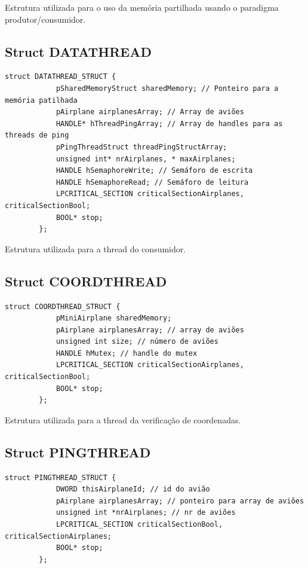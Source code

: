 \documentclass[11pt]{article}
\begin{document}
	Estrutura utilizada para o uso da memória partilhada usando o paradigma produtor/consumidor.
	
	
	\large
	\subsection{Struct DATATHREAD}
	\normalsize
	
	\begin{lstlisting}[caption=Struct DATATHREAD\_STRUCT]
        struct DATATHREAD_STRUCT {
        	pSharedMemoryStruct sharedMemory; // Ponteiro para a memória patilhada
        	pAirplane airplanesArray; // Array de aviões
        	HANDLE* hThreadPingArray; // Array de handles para as threads de ping
        	pPingThreadStruct threadPingStructArray;
        	unsigned int* nrAirplanes, * maxAirplanes;
        	HANDLE hSemaphoreWrite; // Semáforo de escrita
        	HANDLE hSemaphoreRead; // Semáforo de leitura
        	LPCRITICAL_SECTION criticalSectionAirplanes, criticalSectionBool;
        	BOOL* stop;
        };
	\end{lstlisting}
	
	Estrutura utilizada para a thread do consumidor.


	\large
	\subsection{Struct COORDTHREAD}
	\normalsize
	
	\begin{lstlisting}[caption=Struct COORDTHREAD\_STRUCT]
        struct COORDTHREAD_STRUCT {
        	pMiniAirplane sharedMemory;
        	pAirplane airplanesArray; // array de aviões
        	unsigned int size; // número de aviões
        	HANDLE hMutex; // handle do mutex
        	LPCRITICAL_SECTION criticalSectionAirplanes, criticalSectionBool;
        	BOOL* stop;
        };
	\end{lstlisting}
	
	Estrutura utilizada para a thread da verificação de coordenadas.


	\large
	\subsection{Struct PINGTHREAD}
	\normalsize
	
	\begin{lstlisting}[caption=Struct PINGTHREAD\_STRUCT]
        struct PINGTHREAD_STRUCT {
        	DWORD thisAirplaneId; // id do avião
        	pAirplane airplanesArray; // ponteiro para array de aviões
        	unsigned int *nrAirplanes; // nr de aviões
        	LPCRITICAL_SECTION criticalSectionBool, criticalSectionAirplanes;
        	BOOL* stop;
        };
	\end{lstlisting}
	
\end{document}
